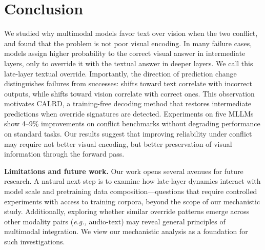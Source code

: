 
\section{Conclusion}

We studied why multimodal models favor text over vision when the two conflict, and found that the problem is not poor visual encoding. In many failure cases, models assign higher probability to the correct visual answer in intermediate layers, only to override it with the textual answer in deeper layers. We call this late-layer textual override. Importantly, the direction of prediction change distinguishes failures from successes: shifts toward text correlate with incorrect outputs, while shifts toward vision correlate with correct ones. This observation motivates CALRD, a training-free decoding method that restores intermediate predictions when override signatures are detected. Experiments on five MLLMs show 4--9\% improvements on conflict benchmarks without degrading performance on standard tasks. Our results suggest that improving reliability under conflict may require not better visual encoding, but better preservation of visual information through the forward pass.

\textbf{Limitations and future work.} Our work opens several avenues for future research. A natural next step is to examine how late-layer dynamics interact with model scale and pretraining data composition—questions that require controlled experiments with access to training corpora, beyond the scope of our mechanistic study. Additionally, exploring whether similar override patterns emerge across other modality pairs (\textit{e.g., }audio-text) may reveal general principles of multimodal integration. We view our mechanistic analysis as a foundation for such investigations.
